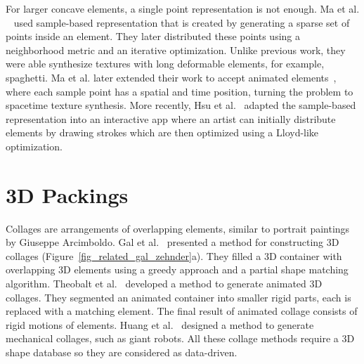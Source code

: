 \newtext
{
For larger concave elements, a single point representation is not enough.
Ma et al. ~\cite{Ma2011} used sample-based representation that
is created by generating a sparse set of points inside an element.
They later distributed these points using a neighborhood metric and an iterative optimization.
Unlike previous work, they were able synthesize textures with long deformable elements, for example, spaghetti.
Ma et al. later extended their work to accept animated elements~\cite{Ma2013}, where
each sample point has a spatial and time position, turning the problem to spacetime texture synthesis.
More recently, Hsu et al.~\cite{Hsu2020} adapted the sample-based representation into an interactive app
where an artist can initially distribute elements by drawing strokes
which are then optimized using a Lloyd-like optimization.
}




\section{3D Packings}
\newtext
{
Collages are arrangements of overlapping elements, similar to
portrait paintings by Giuseppe Arcimboldo.
Gal et al.~\cite{Gal2007B} presented a method for constructing 3D
collages (Figure~\ref{fig_related_gal_zehnder}a).  
They filled a 3D container with overlapping 3D elements using a greedy
approach and a partial shape matching algorithm.
Theobalt et al.~\cite{Theobalt2007}
developed a method to generate animated 3D collages.
They segmented an animated container
into smaller rigid parts, each is replaced with a matching element.
The final result of animated collage consists of rigid motions of elements.
Huang et al.~\cite{Huang2014} designed a method
to generate mechanical collages, such as giant robots.
All these collage methods require a 3D shape database so they are considered as data-driven. 
}

